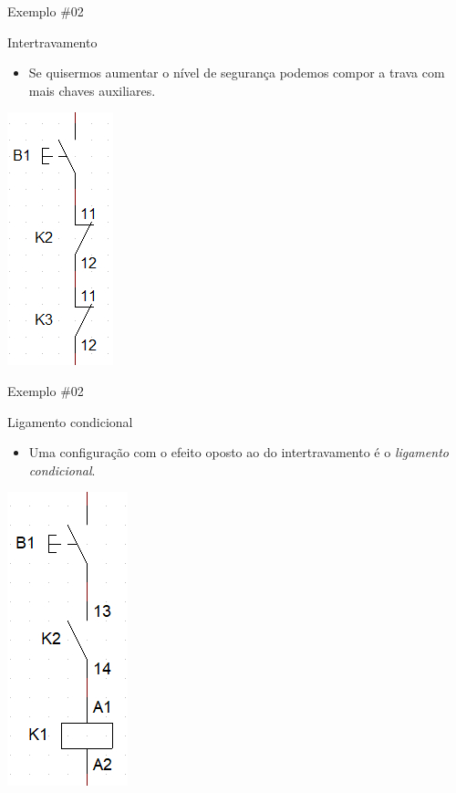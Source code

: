 \begin{frame}{Exemplo \#02}
\begin{block}{Intertravamento}
\begin{itemize}
    \item Se quisermos aumentar o nível de segurança podemos compor a trava com mais chaves auxiliares.
\end{itemize}
\end{block}
\centerline{\includegraphics[width=0.2\linewidth]{Figuras/Ch07/fig10.jpg}}
\end{frame}


\begin{frame}{Exemplo \#02}
\begin{block}{Ligamento condicional}
\begin{itemize}
    \item Uma configuração com o efeito oposto ao do intertravamento é o \textit{ligamento condicional}.
\end{itemize}
\end{block}
\centerline{\includegraphics[width=0.2\linewidth]{Figuras/Ch07/fig11.jpg}}
\end{frame}


